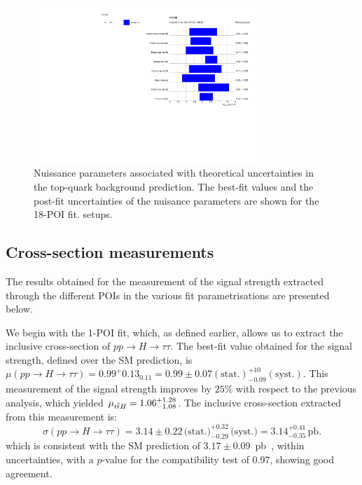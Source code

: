 \begin{figure}[htbp]
  \centering
  \includegraphics[width=0.75\textwidth]{images/fit_stxs/STXS_combine_all_xs_NP_theory_top.pdf}
  \caption{Nuissance parameters associated with theoretical uncertainties in the top-quark background prediction. The best-fit values and the post-fit uncertainties
  of the nuisance parameters are shown for the 18-POI fit.
  setups.}
  \label{fig:constraint_theory_top}
\end{figure}


\subsection{Cross-section measurements}
\label{xsect}

The results obtained for the measurement of the signal strength extracted through the different POIs in the various fit parametrisations are presented below. 

We begin with the 1-POI fit, which, as defined earlier, allows us to extract the inclusive cross-section of $pp \to H \to \tau \tau$. The best-fit value obtained for the signal strength, defined over the SM prediction, is 
$\mu(pp \to H \to \tau \tau) = 0.99^+0.13_{0.11} = 0.99 \pm 0.07 (\text{stat.})^{+10}_{-0.09}(\text{syst.})$. 
This measurement of the signal strength improves by $25\%$ with respect to the previous analysis, which yielded $\mu_{t\overline{t}H} = 1.06^{+1.28}_{-1.08}$. The inclusive cross-section extracted from this measurement is:
\begin{equation}
  \sigma(pp \to H \to \tau\tau) 
  = 3.14 \pm 0.22 \, \text{(stat.)}^{+0.32}_{-0.29} \, \text{(syst.)} 
  = 3.14^{+0.41}_{-0.35} \, \text{pb}.
  \label{eq:htautau_xs}
  \end{equation}
  which is consistent with the SM prediction of $3.17 \pm 0.09$~pb~\cite{https://doi.org/10.23731/cyrm-2017-002}, within uncertainties, with a $p$-value for the compatibility test of 0.97, showing good agreement. 

